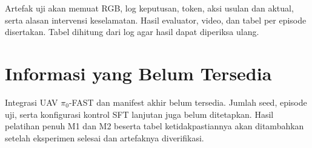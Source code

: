 Artefak uji akan memuat RGB, log keputusan, token, aksi usulan dan aktual, serta alasan intervensi keselamatan. Hasil evaluator, video, dan tabel per episode disertakan. Tabel dihitung dari log agar hasil dapat diperiksa ulang.

\section{Informasi yang Belum Tersedia}
Integrasi UAV $\pi_0$-FAST dan manifest akhir belum tersedia. Jumlah seed, episode uji, serta konfigurasi kontrol SFT lanjutan juga belum ditetapkan. Hasil pelatihan penuh M1 dan M2 beserta tabel ketidakpastiannya akan ditambahkan setelah eksperimen selesai dan artefaknya diverifikasi.
